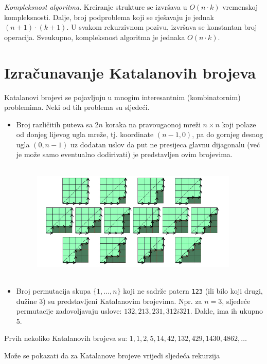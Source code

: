   \textit{Kompleksnost algoritma}.  Kreiranje strukture se izvršava u $O(n\cdot k)$ vremenskoj kompleksnosti. Dalje,  broj podproblema koji se rješavaju je jednak $(n+1) \cdot (k+1)$.  U svakom rekurzivnom pozivu, izvršava se konstantan broj operacija. Sveukupno, kompleksnost algoritma je jednaka $O(n \cdot k)$. 
  
  
  
   
 \section{Izračunavanje Katalanovih brojeva}
 
 Katalanovi brojevi se pojavljuju u mnogim interesantnim (kombinatornim)
 problemima. Neki od tih problema su sljedeći. 
 
 \begin{itemize}
 	\item Broj različitih puteva sa $2n$ koraka na pravougaonoj mreži $n \times n$ koji polaze od 	donjeg lijevog ugla mreže, tj. koordinate $(n - 1, 0)$, pa do gornjeg desnog ugla $(0, n -1)$ uz dodatan uslov da put ne presijeca glavnu dijagonalu (već je može samo eventualno dodirivati) je predstavljen ovim brojevima.
 	
 	\begin{figure}[H]
 		\centering
 		\includegraphics[width=280pt,height=160pt]{slike/catalan-net.png}
 	\end{figure}
 	\item Broj permutacija skupa $\{1, \ldots, n \}$ koji ne sadrže patern \texttt{123} (ili bilo koji drugi, dužine 3) su predstavljeni Katalanovim brojevima. Npr. za $n = 3$, sljedeće permutacije zadovoljavaju uslove: $132,
 	213, 231, 312 i 321$.  Dakle, ima ih ukupno 5. 
 \end{itemize}
 
 Prvih nekoliko Katalanovih brojeva su: $1, 1, 2, 5, 14, 42, 132,
 429, 1430, 4862, \ldots $
 
 
 Može se pokazati da za Katalanove brojeve vrijedi sljedeća rekurzija
 
